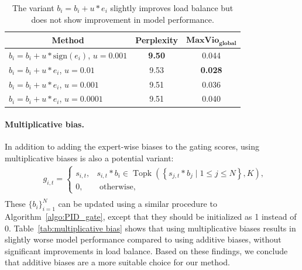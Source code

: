 \documentclass{article}
\begin{document}
\begin{table}[t]
\caption{The variant $ b_i = b_i + u*e_i$ slightly improves load balance but does not show improvement in model performance.}
\label{tab:update_rule}
\begin{center}
\begin{tabular}{l|c|c}
\toprule
\multicolumn{1}{c|}{\textbf{Method}} & \textbf{Perplexity} & $\textbf{MaxVio}_\textbf{global}$ \\
\midrule
$b_i =  b_i + u*\text{sign}(e_i)$, $u=0.001$ & \textbf{9.50} & 0.044 \\
$b_i = b_i + u*e_i$, $u=0.01$ & 9.53 & \textbf{0.028}\\ 
$ b_i =  b_i + u*e_i$, $u=0.001$ &  9.51 & 0.036 \\
$ b_i = b_i + u*e_i$, $u=0.0001$ & 9.51  & 0.040 \\
\bottomrule
\end{tabular}
\end{center}
\end{table}

\paragraph{Multiplicative bias.}
In addition to adding the expert-wise biases to the gating scores, using multiplicative biases is also a potential variant:
\begin{equation}
\label{eq:pid_gate_bias}
\begin{aligned}
& g_{i, t}= \begin{cases}s_{i, t}, & s_{i, t}  * {b}_i \in \operatorname{Topk}\left(\left\{s_{j, t}  * {b}_j\mid 1 \leq j \leq N\right\}, K\right), \\
0, & \text { otherwise, }\end{cases} \\
\end{aligned} 
\end{equation}
These $\{{b}_i\}_{i=1}^N$ can be updated using a similar procedure to Algorithm~\ref{algo:PID_gate}, except that they should be initialized as 1 instead of 0. 
Table~\ref{tab:multiplicative bias} shows that using multiplicative biases results in slightly worse model performance compared to using additive biases, without significant improvements in load balance.
Based on these findings, we conclude that additive biases are a more suitable choice for our method.
\end{document}
